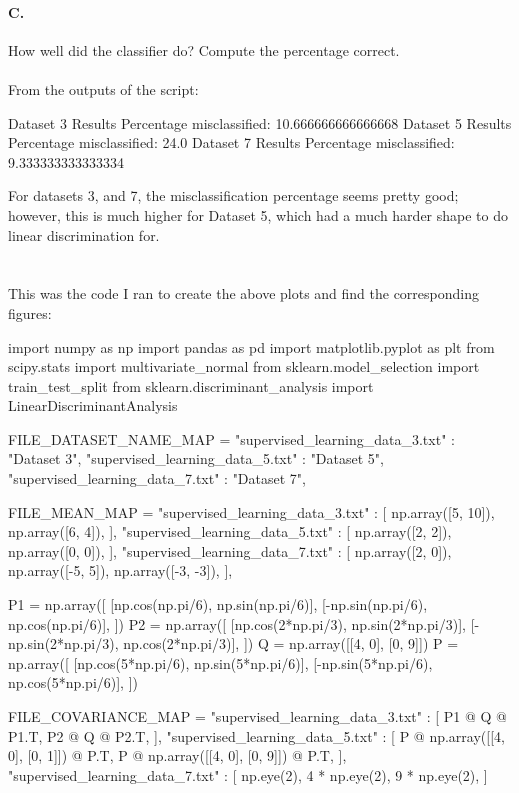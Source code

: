 \documentclass{article}
\begin{document}
{\paragraph*{C.}
How well did the classifier do? Compute the percentage correct. \\ \\
From the outputs of the script:
\begin{spverbatim}
Dataset 3 Results
Percentage misclassified: 10.666666666666668%
Dataset 5 Results
Percentage misclassified: 24.0%
Dataset 7 Results
Percentage misclassified: 9.333333333333334%
\end{spverbatim}
For datasets 3, and 7, the misclassification percentage seems pretty good; however, this is much higher for Dataset 5, which had a much harder shape to do linear discrimination for. \\ \\ \\
This was the code I ran to create the above plots and find the corresponding figures:
\begin{spverbatim}
import numpy as np
import pandas as pd
import matplotlib.pyplot as plt
from scipy.stats import multivariate_normal
from sklearn.model_selection import train_test_split
from sklearn.discriminant_analysis import LinearDiscriminantAnalysis

FILE_DATASET_NAME_MAP = {
  "supervised_learning_data_3.txt" : "Dataset 3",
  "supervised_learning_data_5.txt" : "Dataset 5",
  "supervised_learning_data_7.txt" : "Dataset 7",
}

FILE_MEAN_MAP = {
  "supervised_learning_data_3.txt" : [
    np.array([5, 10]),
    np.array([6, 4]),
  ],
  "supervised_learning_data_5.txt" : [
    np.array([2, 2]),
    np.array([0, 0]),
  ],
  "supervised_learning_data_7.txt" : [
    np.array([2, 0]),
    np.array([-5, 5]),
    np.array([-3, -3]),
  ],
}

P1 = np.array([
  [np.cos(np.pi/6), np.sin(np.pi/6)], 
  [-np.sin(np.pi/6), np.cos(np.pi/6)],
])
P2 = np.array([
  [np.cos(2*np.pi/3), np.sin(2*np.pi/3)], 
  [-np.sin(2*np.pi/3), np.cos(2*np.pi/3)],
])
Q = np.array([[4, 0], [0, 9]])
P = np.array([
  [np.cos(5*np.pi/6), np.sin(5*np.pi/6)], 
  [-np.sin(5*np.pi/6), np.cos(5*np.pi/6)],
])

FILE_COVARIANCE_MAP = {
  "supervised_learning_data_3.txt" : [
    P1 @ Q @ P1.T,
    P2 @ Q @ P2.T,
  ],
  "supervised_learning_data_5.txt" : [
    P @ np.array([[4, 0], [0, 1]]) @ P.T,
    P @ np.array([[4, 0], [0, 9]]) @ P.T,
  ],
  "supervised_learning_data_7.txt" : [
    np.eye(2), 
    4 * np.eye(2), 
    9 * np.eye(2),
  ]
}




\end{spverbatim}}
\end{document}
